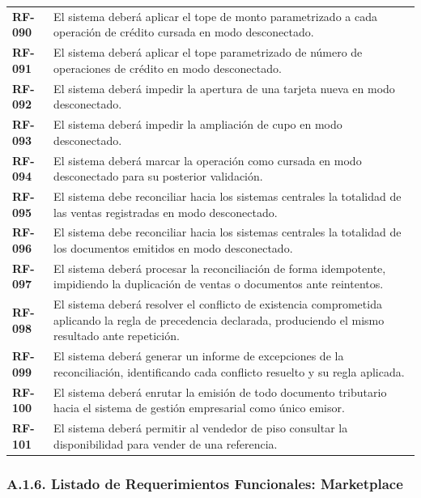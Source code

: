 \documentclass[11pt]{article}
\begin{document}
\begin{longtable}[]{@{}
  >{\raggedright\arraybackslash}p{}
  >{\raggedright\arraybackslash}p{}@{}}
\addlinespace[2pt]
\textbf{RF-090} & El sistema deberá aplicar el tope de monto parametrizado a cada operación de crédito cursada en modo desconectado. \\
\addlinespace[2pt]
\textbf{RF-091} & El sistema deberá aplicar el tope parametrizado de número de operaciones de crédito en modo desconectado. \\
\addlinespace[2pt]
\textbf{RF-092} & El sistema deberá impedir la apertura de una tarjeta nueva en modo desconectado. \\
\addlinespace[2pt]
\textbf{RF-093} & El sistema deberá impedir la ampliación de cupo en modo desconectado. \\
\addlinespace[2pt]
\textbf{RF-094} & El sistema deberá marcar la operación como cursada en modo desconectado para su posterior validación. \\
\addlinespace[2pt]
\textbf{RF-095} & El sistema debe reconciliar hacia los sistemas centrales la totalidad de las ventas registradas en modo desconectado. \\
\addlinespace[2pt]
\textbf{RF-096} & El sistema debe reconciliar hacia los sistemas centrales la totalidad de los documentos emitidos en modo desconectado. \\
\addlinespace[2pt]
\textbf{RF-097} & El sistema deberá procesar la reconciliación de forma idempotente, impidiendo la duplicación de ventas o documentos ante reintentos. \\
\addlinespace[2pt]
\textbf{RF-098} & El sistema deberá resolver el conflicto de existencia comprometida aplicando la regla de precedencia declarada, produciendo el mismo resultado ante repetición. \\
\addlinespace[2pt]
\textbf{RF-099} & El sistema deberá generar un informe de excepciones de la reconciliación, identificando cada conflicto resuelto y su regla aplicada. \\
\addlinespace[2pt]
\textbf{RF-100} & El sistema deberá enrutar la emisión de todo documento tributario hacia el sistema de gestión empresarial como único emisor. \\
\addlinespace[2pt]
\textbf{RF-101} & El sistema deberá permitir al vendedor de piso consultar la disponibilidad para vender de una referencia. \\
\end{longtable}

\subsubsection{A.1.6. Listado de Requerimientos Funcionales: Marketplace}\label{a-1-6-listado-de-requerimientos-funcionales-marketplace}
\end{document}
